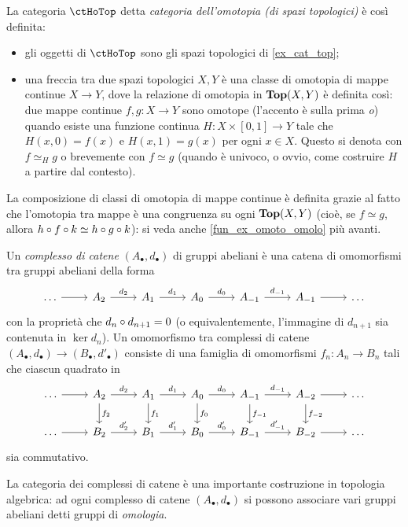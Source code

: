 \begin{example}\label{ex_cat_hotop}
	La categoria $\ctHoTop$ detta \emph{categoria dell'omotopia (di spazi topologici)} è così definita:
	\begin{itemize}
		\item gli oggetti di $\ctHoTop$ sono gli spazi topologici di \ref{ex_cat_top};
		\item una freccia tra due spazi topologici $X,Y$ è una classe di omotopia di mappe continue $X\to Y$, dove la relazione di omotopia in $\mathbf{Top}(X,Y)$ è definita così: due mappe continue $f,g : X\to Y$ sono omotope (l'accento è sulla prima \emph{o}) quando esiste una funzione continua $H : X \times [0,1] \to Y$ tale che $H(x,0) = f(x)$ e $H(x,1)=g(x)$ per ogni $x\in X$. Questo si denota con $f\simeq_H g$ o brevemente con $f\simeq g$ (quando è univoco, o ovvio, come costruire $H$ a partire dal contesto).
	\end{itemize}
	La composizione di classi di omotopia di mappe continue è definita grazie al fatto che l'omotopia tra mappe è una congruenza su ogni $\mathbf{Top}(X,Y)$ (cioè, se $f\simeq g$, allora $h\circ f\circ k\simeq h\circ g\circ k$): si veda anche \ref{fun_ex_omoto_omolo} più avanti.
\end{example}
\begin{example}
	Un \emph{complesso di catene} $(A_\bullet, d_\bullet)$ di gruppi abeliani è una catena di omomorfismi tra gruppi abeliani della forma
	\[\begin{tikzcd}
		\dots \ar[r] & A_2 \ar[r, "d_2"] & A_1  \ar[r, "d_1"] & A_0 \ar[r, "d_0"] & A_{-1} \ar[r, "d_{-1}"] & A_{-1} \ar[r] & \dots
	\end{tikzcd}\]
	con la proprietà che $d_n\circ d_{n+1}=0$ (o equivalentemente, l'immagine di $d_{n+1}$ sia contenuta in $\ker d_n$). Un omomorfismo tra complessi di catene $(A_\bullet,d_\bullet) \to (B_\bullet,d'_\bullet)$ consiste di una famiglia di omomorfismi $f_n : A_n \to B_n$ tali che ciascun quadrato in
	\[\begin{tikzcd}
    \dots \ar[r] & A_2 \ar[d,"f_2"]\ar[r, "d_2"] & A_1 \ar[d,"f_1"] \ar[r, "d_1"] & A_0 \ar[d,"f_0"]\ar[r, "d_0"] & A_{-1} \ar[d,"f_{-1}"]\ar[r, "d_{-1}"] & A_{-2} \ar[d, "f_{-2}"]\ar[r] & \dots\\
		\dots \ar[r] & B_2 \ar[r, "d_2'"] & B_1  \ar[r, "d_1'"] & B_0 \ar[r, "d_0'"] & B_{-1} \ar[r, "d_{-1}'"] & B_{-2} \ar[r] & \dots
	\end{tikzcd}\]
	sia commutativo.

La categoria dei complessi di catene è una importante costruzione in topologia algebrica: ad ogni complesso di catene $(A_\bullet, d_\bullet)$ si possono associare vari gruppi abeliani detti gruppi di \emph{omologia}.
\end{example}
